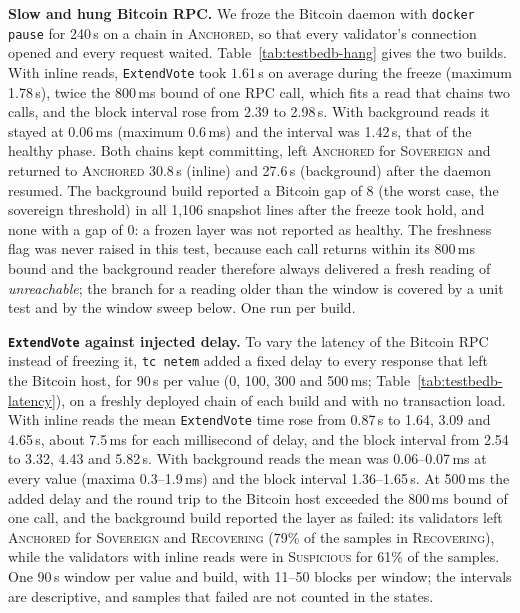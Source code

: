 \textbf{Slow and hung Bitcoin RPC.} We froze the Bitcoin daemon with \texttt{docker pause} for 240\,s on a chain in \textsc{Anchored}, so that every validator's connection opened and every request waited. Table~\ref{tab:testbedb-hang} gives the two builds. With inline reads, \texttt{ExtendVote} took $1.61$\,s on average during the freeze (maximum 1.78\,s), twice the 800\,ms bound of one RPC call, which fits a read that chains two calls, and the block interval rose from 2.39 to 2.98\,s. With background reads it stayed at $0.06$\,ms (maximum 0.6\,ms) and the interval was 1.42\,s, that of the healthy phase. Both chains kept committing, left \textsc{Anchored} for \textsc{Sovereign} and returned to \textsc{Anchored} 30.8\,s (inline) and 27.6\,s (background) after the daemon resumed. The background build reported a Bitcoin gap of 8 (the worst case, the sovereign threshold) in all 1{,}106 snapshot lines after the freeze took hold, and none with a gap of 0: a frozen layer was not reported as healthy. The freshness flag was never raised in this test, because each call returns within its 800\,ms bound and the background reader therefore always delivered a fresh reading of \emph{unreachable}; the branch for a reading older than the window is covered by a unit test and by the window sweep below. One run per build.

\begin{table}[tbp]
\caption{Hung Bitcoin RPC on Testbed~B (daemon frozen for 240\,s, one run per build, no transaction load). Block intervals from the sampled heights; states are shares of the samples of all seven validators.}
\label{tab:testbedb-hang}
\centering
\scriptsize
\resizebox{\linewidth}{!}{}
\end{table}

\textbf{\texttt{ExtendVote} against injected delay.} To vary the latency of the Bitcoin RPC instead of freezing it, \texttt{tc netem} added a fixed delay to every response that left the Bitcoin host, for 90\,s per value (0, 100, 300 and 500\,ms; Table~\ref{tab:testbedb-latency}), on a freshly deployed chain of each build and with no transaction load. With inline reads the mean \texttt{ExtendVote} time rose from 0.87\,s to 1.64, 3.09 and 4.65\,s, about 7.5\,ms for each millisecond of delay, and the block interval from 2.54 to 3.32, 4.43 and 5.82\,s. With background reads the mean was 0.06--0.07\,ms at every value (maxima 0.3--1.9\,ms) and the block interval 1.36--1.65\,s. At 500\,ms the added delay and the round trip to the Bitcoin host exceeded the 800\,ms bound of one call, and the background build reported the layer as failed: its validators left \textsc{Anchored} for \textsc{Sovereign} and \textsc{Recovering} (79\% of the samples in \textsc{Recovering}), while the validators with inline reads were in \textsc{Suspicious} for 61\% of the samples. One 90\,s window per value and build, with 11--50 blocks per window; the intervals are descriptive, and samples that failed are not counted in the states.

